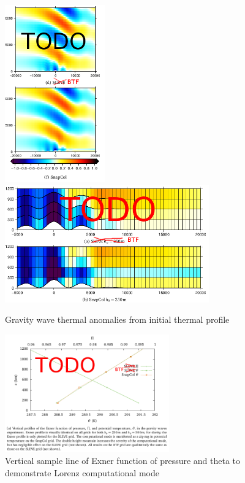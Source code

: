\documentclass[twocol]{ametsoc}
\begin{document}
\begin{figure}
	\includegraphics[height=3in]{gw-theta.png}
	\includegraphics[height=2in]{gw-theta-zoom.png}
%
	\caption{Gravity wave thermal anomalies from initial thermal profile}
	\label{fig:gw-theta}
\end{figure}

\begin{figure}
	\includegraphics[height=2in]{gw-exner-theta.png}
%
	\caption{Vertical sample line of Exner function of pressure and theta to demonstrate Lorenz computational mode}
	\label{fig:gw-exner-theta}
\end{figure}
\end{document}
